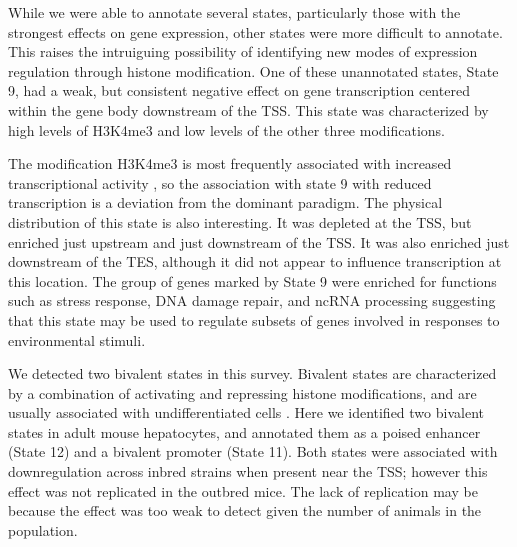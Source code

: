 \documentclass[
  11pt,
]{article}
\begin{document}
While we were able to annotate several states, particularly those with
the strongest effects on gene expression, other states were more
difficult to annotate. This raises the intruiguing possibility of
identifying new modes of expression regulation through histone
modification. One of these unannotated states, State 9, had a weak, but
consistent negative effect on gene transcription centered within the
gene body downstream of the TSS. This state was characterized by high
levels of H3K4me3 and low levels of the other three modifications.

The modification H3K4me3 is most frequently associated with increased
transcriptional activity
\citep{pmid15680324, pmid14661024, pmid12353038, pmid16728976}, so the
association with state 9 with reduced transcription is a deviation from
the dominant paradigm. The physical distribution of this state is also
interesting. It was depleted at the TSS, but enriched just upstream and
just downstream of the TSS. It was also enriched just downstream of the
TES, although it did not appear to influence transcription at this
location. The group of genes marked by State 9 were enriched for
functions such as stress response, DNA damage repair, and ncRNA
processing suggesting that this state may be used to regulate subsets of
genes involved in responses to environmental stimuli.

We detected two bivalent states in this survey. Bivalent states are
characterized by a combination of activating and repressing histone
modifications, and are usually associated with undifferentiated cells
\citep{pmid23788621, pmid22513113}. Here we identified two bivalent
states in adult mouse hepatocytes, and annotated them as a poised
enhancer (State 12) and a bivalent promoter (State 11). Both states were
associated with downregulation across inbred strains when present near
the TSS; however this effect was not replicated in the outbred mice. The
lack of replication may be because the effect was too weak to detect
given the number of animals in the population.
\end{document}
